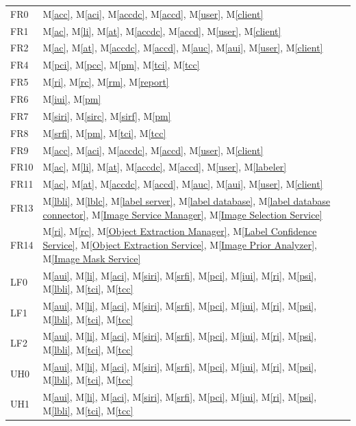 \documentclass[12pt, titlepage]{article}
\newcommand{\mref}[1]{M\ref{#1}}
\begin{document}
\begin{longtable}{p{} p{}}
  FR0 & \mref{acc}, \mref{aci}, \mref{accdc}, \mref{accd}, \mref{user}, \mref{client} \\
  FR1 & \mref{ac}, \mref{li}, \mref{at}, \mref{accdc}, \mref{accd}, \mref{user}, \mref{client} \\
  FR2 & \mref{ac}, \mref{at}, \mref{accdc}, \mref{accd}, \mref{auc}, \mref{aui}, \mref{user}, \mref{client} \\
  FR4 &  \mref{pci}, \mref{pcc}, \mref{pm}, \mref{tci}, \mref{tcc}\\
  FR5 &  \mref{ri}, \mref{rc}, \mref{rm}, \mref{report}\\
  FR6 &  \mref{iui}, \mref{pm} \\
  FR7 &  \mref{siri}, \mref{sirc}, \mref{sirf}, \mref{pm} \\
  FR8 &  \mref{srfi}, \mref{pm}, \mref{tci}, \mref{tcc}\\
  FR9 & \mref{acc}, \mref{aci}, \mref{accdc}, \mref{accd}, \mref{user}, \mref{client} \\
  FR10 & \mref{ac}, \mref{li}, \mref{at}, \mref{accdc}, \mref{accd}, \mref{user}, \mref{labeler} \\
  FR11 & \mref{ac}, \mref{at}, \mref{accdc}, \mref{accd}, \mref{auc}, \mref{aui}, \mref{user}, \mref{client} \\
  FR13 &  \mref{lbli}, \mref{lblc}, \mref{label server}, \mref{label database}, \mref{label database connector}, \mref{Image Service Manager}, \mref{Image Selection Service}\\
  FR14 &  \mref{ri}, \mref{rc}, \mref{Object Extraction Manager}, \mref{Label Confidence Service}, \mref{Object Extraction Service}, \mref{Image Prior Analyzer}, \mref{Image Mask Service}  \\
  LF0 & \mref{aui}, \mref{li}, \mref{aci}, \mref{siri}, \mref{srfi}, \mref{pci}, \mref{iui}, \mref{ri}, \mref{psi}, \mref{lbli}, \mref{tci}, \mref{tcc}\\
  LF1 & \mref{aui}, \mref{li}, \mref{aci}, \mref{siri}, \mref{srfi}, \mref{pci}, \mref{iui}, \mref{ri}, \mref{psi}, \mref{lbli}, \mref{tci}, \mref{tcc}\\
  LF2 & \mref{aui}, \mref{li}, \mref{aci}, \mref{siri}, \mref{srfi}, \mref{pci}, \mref{iui}, \mref{ri}, \mref{psi}, \mref{lbli}, \mref{tci}, \mref{tcc}\\
  UH0 & \mref{aui}, \mref{li}, \mref{aci}, \mref{siri}, \mref{srfi}, \mref{pci}, \mref{iui}, \mref{ri}, \mref{psi}, \mref{lbli}, \mref{tci}, \mref{tcc}\\
  UH1 & \mref{aui}, \mref{li}, \mref{aci}, \mref{siri}, \mref{srfi}, \mref{pci}, \mref{iui}, \mref{ri}, \mref{psi}, \mref{lbli}, \mref{tci}, \mref{tcc}\\

\end{longtable}
\end{document}
